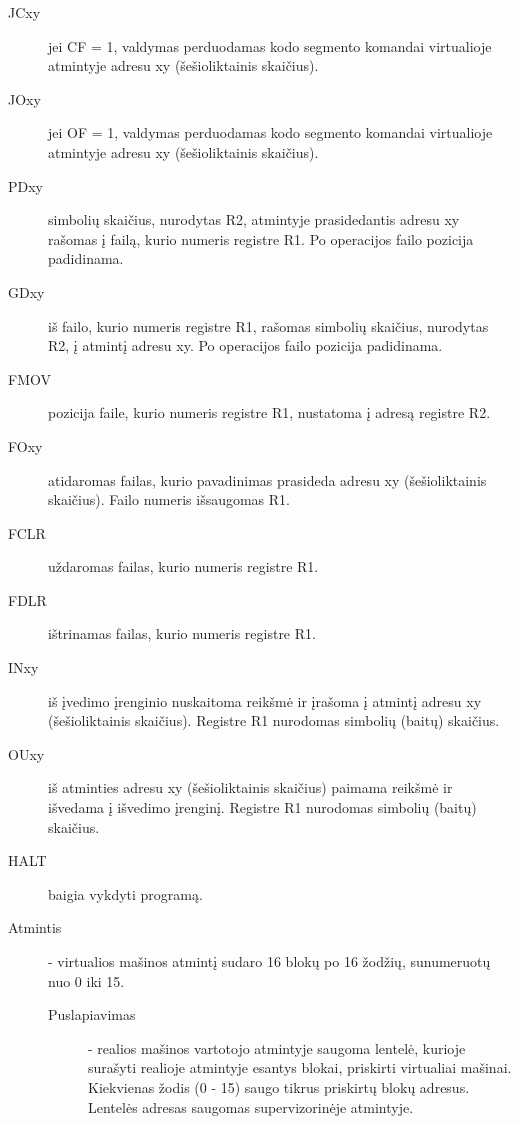 \begin{description}
\begin{description}
        \item[JCxy] jei CF = 1, valdymas perduodamas kodo segmento komandai virtualioje atmintyje adresu xy (šešioliktainis skaičius). 
        \item[JOxy] jei OF = 1, valdymas perduodamas kodo segmento komandai virtualioje atmintyje adresu xy (šešioliktainis skaičius).

        \item[PDxy] simbolių skaičius, nurodytas R2, atmintyje prasidedantis adresu xy rašomas į failą, kurio numeris registre R1. Po operacijos failo pozicija padidinama.
        \item[GDxy] iš failo, kurio numeris registre R1, rašomas simbolių skaičius, nurodytas R2, į atmintį adresu xy. Po operacijos failo pozicija padidinama.
        \item[FMOV] pozicija faile, kurio numeris registre R1, nustatoma į adresą registre R2.
        
        \item[FOxy] atidaromas failas, kurio pavadinimas prasideda adresu xy (šešioliktainis skaičius). Failo numeris išsaugomas R1.
        \item[FCLR] uždaromas failas, kurio numeris registre R1.
        \item[FDLR] ištrinamas failas, kurio numeris registre R1.

        \item[INxy] iš įvedimo įrenginio nuskaitoma reikšmė ir įrašoma į atmintį adresu xy (šešioliktainis skaičius). Registre R1 nurodomas simbolių (baitų) skaičius.
        \item[OUxy] iš atminties adresu xy (šešioliktainis skaičius) paimama reikšmė ir išvedama į išvedimo įrenginį. Registre R1 nurodomas simbolių (baitų) skaičius.

        \item[HALT] baigia vykdyti programą.
        
    \end{description}
\end{description}

\begin{description}
\item[Atmintis] - virtualios mašinos atmintį sudaro 16 blokų po 16 žodžių, sunumeruotų nuo 0 iki 15.
    \begin{description}
    \item[Puslapiavimas] - realios mašinos vartotojo atmintyje saugoma lentelė, kurioje surašyti realioje atmintyje esantys blokai, priskirti virtualiai mašinai. Kiekvienas žodis (0 - 15) saugo tikrus priskirtų blokų adresus. Lentelės adresas saugomas supervizorinėje atmintyje.
    \end{description}
\end{description}

